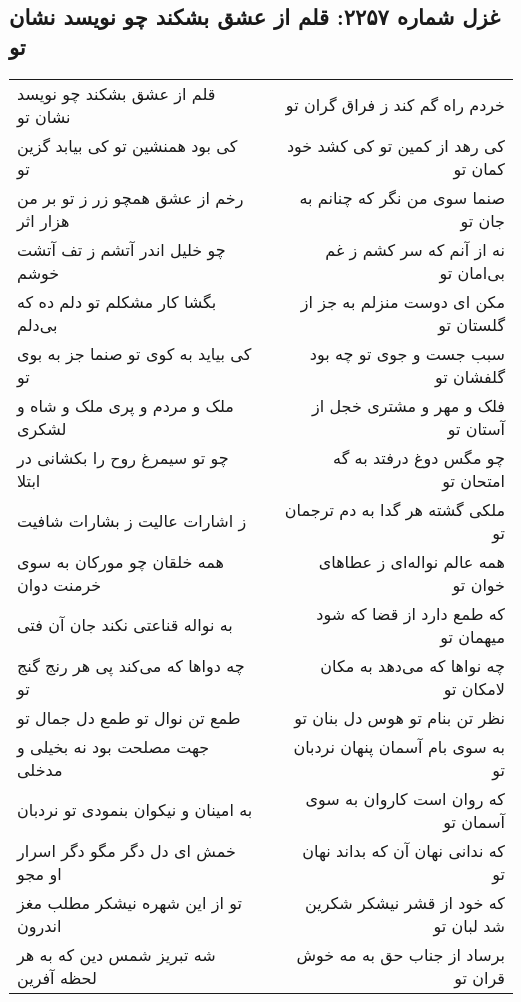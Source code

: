 \begin{center}
\section*{غزل شماره ۲۲۵۷: قلم از عشق بشکند چو نویسد نشان تو}
\label{sec:2257}
\begin{longtable}{l p{0.5cm} r}
قلم از عشق بشکند چو نویسد نشان تو
&&
خردم راه گم کند ز فراق گران تو
\\
کی بود همنشین تو کی بیابد گزین تو
&&
کی رهد از کمین تو کی کشد خود کمان تو
\\
رخم از عشق همچو زر ز تو بر من هزار اثر
&&
صنما سوی من نگر که چنانم به جان تو
\\
چو خلیل اندر آتشم ز تف آتشت خوشم
&&
نه از آنم که سر کشم ز غم بی‌امان تو
\\
بگشا کار مشکلم تو دلم ده که بی‌دلم
&&
مکن ای دوست منزلم به جز از گلستان تو
\\
کی بیاید به کوی تو صنما جز به بوی تو
&&
سبب جست و جوی تو چه بود گلفشان تو
\\
ملک و مردم و پری ملک و شاه و لشکری
&&
فلک و مهر و مشتری خجل از آستان تو
\\
چو تو سیمرغ روح را بکشانی در ابتلا
&&
چو مگس دوغ درفتد به گه امتحان تو
\\
ز اشارات عالیت ز بشارات شافیت
&&
ملکی گشته هر گدا به دم ترجمان تو
\\
همه خلقان چو مورکان به سوی خرمنت دوان
&&
همه عالم نواله‌ای ز عطاهای خوان تو
\\
به نواله قناعتی نکند جان آن فتی
&&
که طمع دارد از قضا که شود میهمان تو
\\
چه دواها که می‌کند پی هر رنج گنج تو
&&
چه نواها که می‌دهد به مکان لامکان تو
\\
طمع تن نوال تو طمع دل جمال تو
&&
نظر تن بنام تو هوس دل بنان تو
\\
جهت مصلحت بود نه بخیلی و مدخلی
&&
به سوی بام آسمان پنهان نردبان تو
\\
به امینان و نیکوان بنمودی تو نردبان
&&
که روان است کاروان به سوی آسمان تو
\\
خمش ای دل دگر مگو دگر اسرار او مجو
&&
که ندانی نهان آن که بداند نهان تو
\\
تو از این شهره نیشکر مطلب مغز اندرون
&&
که خود از قشر نیشکر شکرین شد لبان تو
\\
شه تبریز شمس دین که به هر لحظه آفرین
&&
برساد از جناب حق به مه خوش قران تو
\\
\end{longtable}
\end{center}
